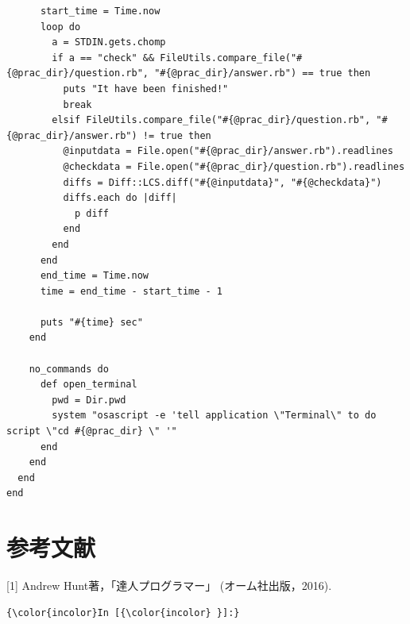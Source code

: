 \documentclass[11pt,dvipdfmx]{jsarticle}
\begin{document}
\begin{verbatim}
      start_time = Time.now
      loop do
        a = STDIN.gets.chomp
        if a == "check" && FileUtils.compare_file("#{@prac_dir}/question.rb", "#{@prac_dir}/answer.rb") == true then
          puts "It have been finished!"
          break
        elsif FileUtils.compare_file("#{@prac_dir}/question.rb", "#{@prac_dir}/answer.rb") != true then
          @inputdata = File.open("#{@prac_dir}/answer.rb").readlines
          @checkdata = File.open("#{@prac_dir}/question.rb").readlines
          diffs = Diff::LCS.diff("#{@inputdata}", "#{@checkdata}")
          diffs.each do |diff|
            p diff
          end
        end
      end
      end_time = Time.now
      time = end_time - start_time - 1
      
      puts "#{time} sec"
    end
    
    no_commands do
      def open_terminal
        pwd = Dir.pwd
        system "osascript -e 'tell application \"Terminal\" to do script \"cd #{@prac_dir} \" '"
      end
    end
  end
end
\end{verbatim}

    \section{参考文献}\label{ux53c2ux8003ux6587ux732e}

    {[}1{]} Andrew Hunt著，「達人プログラマー」 (オーム社出版，2016).

    \begin{Verbatim}[commandchars=\\\{\}]
{\color{incolor}In [{\color{incolor} }]:} 
\end{Verbatim}


    
    
    
    
\end{document}
